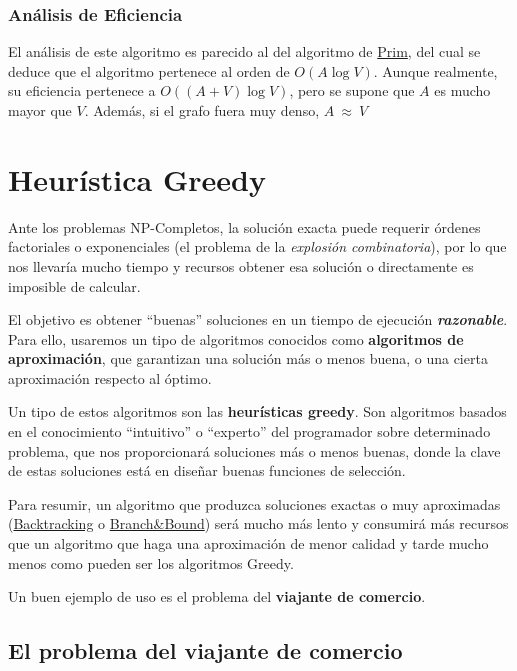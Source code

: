 \documentclass[10pt,a4paper,spanish]{report}
\theoremstyle{definition}
\theoremstyle{remark}
\begin{document}
\newpage

\subsubsection{\textcolor{electriccrimson}Análisis de Eficiencia}

El análisis de este algoritmo es parecido al del algoritmo de \hyperref[algprim]{Prim}, del cual se deduce que el algoritmo pertenece al orden de $O(A \log V)$. Aunque realmente, su eficiencia pertenece a $O((A+V)\log V)$, pero se supone que $A$ es mucho mayor que $V$. Además, si el grafo fuera muy denso, $A~\approx~V$


\section{\textcolor{electriccrimson}Heurística Greedy}

Ante los problemas NP-Completos, la solución exacta puede requerir órdenes factoriales o exponenciales (el problema de la \textit{explosión combinatoria}), por lo que nos llevaría mucho tiempo y recursos obtener esa solución o directamente es imposible de calcular. 

El objetivo es obtener ``buenas'' soluciones en un tiempo de ejecución \textbf{\textit{\textcolor{electriccrimson}{razonable}}}. Para ello, usaremos un tipo de algoritmos conocidos como \textbf{\textcolor{electriccrimson}{algoritmos de aproximación}}, que garantizan una solución más o menos buena, o una cierta aproximación respecto al óptimo.

Un tipo de estos algoritmos son las \textbf{\textcolor{electriccrimson}{heurísticas greedy}}. Son algoritmos basados en el conocimiento ``intuitivo'' o ``experto'' del programador sobre determinado problema, que nos proporcionará soluciones más o menos buenas, donde la clave de estas soluciones está en diseñar buenas funciones de selección. 

Para resumir, un algoritmo que produzca soluciones exactas o muy aproximadas (\hyperref[backtracking]{Backtracking} o \hyperref[branchandbound]{Branch\&Bound}) será mucho más lento y consumirá más recursos que un algoritmo que haga una aproximación de menor calidad y tarde mucho menos como pueden ser los algoritmos Greedy.

Un buen ejemplo de uso es el problema del \textbf{\textcolor{electriccrimson}viajante de comercio}.

\subsection{\textcolor{electriccrimson}El problema del viajante de comercio}
\end{document}
